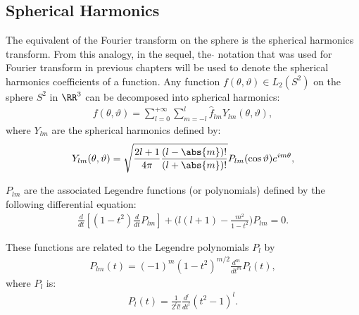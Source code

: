 
 

\subsection{Spherical Harmonics}

The equivalent of the Fourier transform on the sphere is the spherical harmonics transform. From this analogy, in the sequel, the $\hat{ }$ notation that was used for Fourier transform in previous chapters will be used to denote the spherical harmonics coefficients of a function. 
Any function $f(\theta,\vartheta) \in L_2(S^2)$ on the sphere $S^2$ in $\RR^3$ can be decomposed into spherical harmonics:
\begin{eqnarray}
\label{decomp_alm}
f(\theta,\vartheta)=\sum_{l=0}^{+\infty}\sum_{m=-l}^{l} \hat{f}_{lm}Y_{lm}(\theta,\vartheta) ,
\end{eqnarray}
where  $Y_{lm}$ are the spherical harmonics defined by:
\begin{eqnarray}
\label{def_ylm}
Y_{lm}(\theta,\vartheta)=\sqrt{\frac{2l+1}{4\pi}\frac{(l- \abs{m} )!}{(l+ \abs{m} )!}} P_{lm}(\cos\vartheta)e^{im\theta},
\end{eqnarray}

$P_{lm}$ are the  associated Legendre functions (or polynomials) defined by the following differential equation:
\begin{eqnarray}
\label{def_poly_legendre}
\frac{d}{dt} \left[     (1-t^2)   \frac{d}{dt} P_{lm}  \right]   + \Big( l(l+1) - \frac{m^2}{1-t^2}\Big) P_{lm} = 0  .
\end{eqnarray}

These functions are related to the Legendre polynomials $P_{l}$ by 
\begin{eqnarray}
P_{lm}(t)  = (-1)^m (1-t^2)^{m/2}\frac{d^m}{dt^m}P_l(t) ,
\label{def_poly_leg}
\end{eqnarray}
where  $P_l$  is:
\begin{eqnarray}
P_{l}(t)  =\frac{1}{2^l l!}  \frac{d^l}{dt^l} (t^2-1)^l .
\label{def_pl}
\end{eqnarray}

